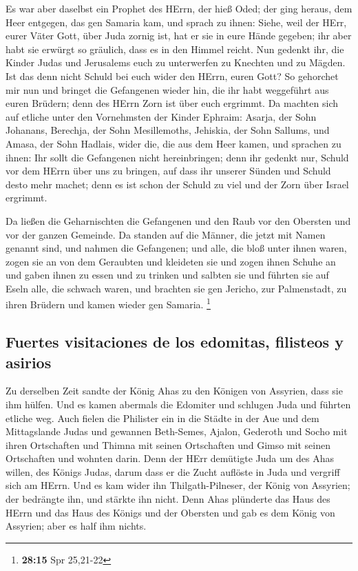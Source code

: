  Es war aber daselbst ein Prophet des HErrn, der hieß
Oded; der ging heraus, dem Heer entgegen, das gen Samaria kam, und
sprach zu ihnen: Siehe, weil der HErr, eurer Väter Gott, über Juda
zornig ist, hat er sie in eure Hände gegeben; ihr aber habt sie erwürgt
so gräulich, dass es in den Himmel reicht.  Nun gedenkt
ihr, die Kinder Judas und Jerusalems euch zu unterwerfen zu Knechten und
zu Mägden. Ist das denn nicht Schuld bei euch wider den HErrn, euren
Gott?  So gehorchet mir nun und bringet die Gefangenen
wieder hin, die ihr habt weggeführt aus euren Brüdern; denn des HErrn
Zorn ist über euch ergrimmt.  Da machten sich auf etliche
unter den Vornehmsten der Kinder Ephraim: Asarja, der Sohn Johanans,
Berechja, der Sohn Mesillemoths, Jehiskia, der Sohn Sallums, und Amasa,
der Sohn Hadlais, wider die, die aus dem Heer kamen,  und
sprachen zu ihnen: Ihr sollt die Gefangenen nicht hereinbringen; denn
ihr gedenkt nur, Schuld vor dem HErrn über uns zu bringen, auf dass ihr
unserer Sünden und Schuld desto mehr machet; denn es ist schon der
Schuld zu viel und der Zorn über Israel ergrimmt.

 Da ließen die Geharnischten die Gefangenen und den Raub
vor den Obersten und vor der ganzen Gemeinde.  Da standen
auf die Männer, die jetzt mit Namen genannt sind, und nahmen die
Gefangenen; und alle, die bloß unter ihnen waren, zogen sie an von dem
Geraubten und kleideten sie und zogen ihnen Schuhe an und gaben ihnen zu
essen und zu trinken und salbten sie und führten sie auf Eseln alle, die
schwach waren, und brachten sie gen Jericho, zur Palmenstadt, zu ihren
Brüdern und kamen wieder gen Samaria. \footnote{\textbf{28:15} Spr
  25,21-22}

\hypertarget{fuertes-visitaciones-de-los-edomitas-filisteos-y-asirios}{%
\subsection{Fuertes visitaciones de los edomitas, filisteos y
asirios}\label{fuertes-visitaciones-de-los-edomitas-filisteos-y-asirios}}

 Zu derselben Zeit sandte der König Ahas zu den Königen
von Assyrien, dass sie ihm hülfen.  Und es kamen abermals
die Edomiter und schlugen Juda und führten etliche weg. 
Auch fielen die Philister ein in die Städte in der Aue und dem
Mittagslande Judas und gewannen Beth-Semes, Ajalon, Gederoth und Socho
mit ihren Ortschaften und Thimna mit seinen Ortschaften und Gimso mit
seinen Ortschaften und wohnten darin.  Denn der HErr
demütigte Juda um des Ahas willen, des Königs Judas, darum dass er die
Zucht auflöste in Juda und vergriff sich am HErrn.  Und
es kam wider ihn Thilgath-Pilneser, der König von Assyrien; der
bedrängte ihn, und stärkte ihn nicht.  Denn Ahas
plünderte das Haus des HErrn und das Haus des Königs und der Obersten
und gab es dem König von Assyrien; aber es half ihm nichts.

